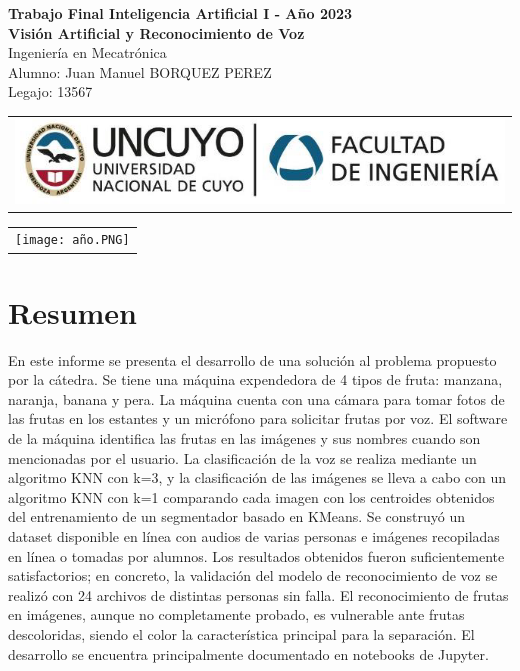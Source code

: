 \documentclass[a4paper, 12pt]{article}
\begin{document}
\begin{titlepage}
    \centering
    \vspace*{5cm}
    {\Large\bfseries Trabajo Final Inteligencia Artificial I - Año 2023}\\
    \vspace{0.2cm}
    {\Large \textbf{Visión Artificial y Reconocimiento de Voz}}\\
    \vspace{0.7cm}
    {\Large Ingeniería en Mecatrónica}\\
    \vspace{1.5cm}
    Alumno: Juan Manuel BORQUEZ PEREZ\\
    Legajo: 13567\\
    \vfill
    {\begin{tabular}{@{}c@{}}\includegraphics[scale=0.4]{escudo.PNG}\end{tabular}}\hspace{10pt}
    {\begin{tabular}{@{}c@{}}\texttt{[image: año.PNG]}\end{tabular}}
\end{titlepage}

\section{Resumen}
En este informe se presenta el desarrollo de una solución al problema propuesto por la cátedra. Se tiene una máquina expendedora de 4 tipos de fruta: manzana, naranja, banana y pera. La máquina cuenta con una cámara para tomar fotos de las frutas en los estantes y un micrófono para solicitar frutas por voz. El software de la máquina identifica las frutas en las imágenes y sus nombres cuando son mencionadas por el usuario. La clasificación de la voz se realiza mediante un algoritmo KNN con k=3, y la clasificación de las imágenes se lleva a cabo con un algoritmo KNN con k=1 comparando cada imagen con los centroides obtenidos del entrenamiento de un segmentador basado en KMeans. Se construyó un dataset disponible en línea con audios de varias personas e imágenes recopiladas en línea o tomadas por alumnos. Los resultados obtenidos fueron suficientemente satisfactorios; en concreto, la validación del modelo de reconocimiento de voz se realizó con 24 archivos de distintas personas sin falla. El reconocimiento de frutas en imágenes, aunque no completamente probado, es vulnerable ante frutas descoloridas, siendo el color la característica principal para la separación. El desarrollo se encuentra principalmente documentado en notebooks de Jupyter.
\vspace{0.5cm}
\end{document}
